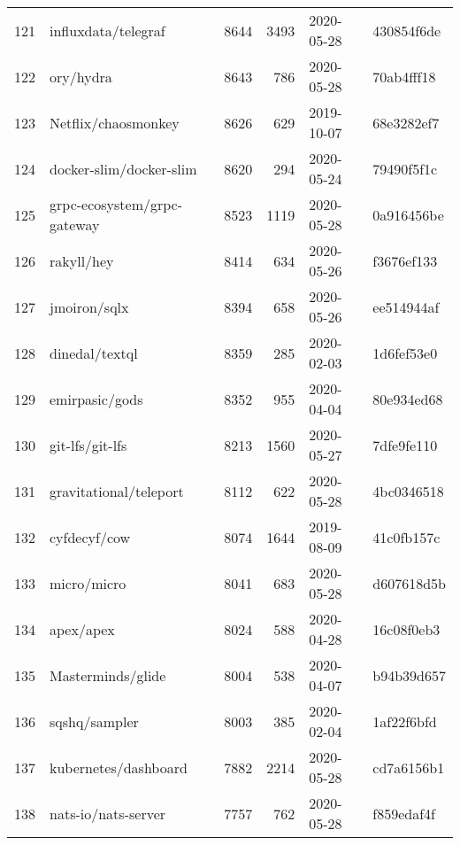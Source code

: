 \begin{longtable}{llrrll}
    121 &                                influxdata/telegraf &   8644 &   3493 & 2020-05-28 &  430854f6de \\
    122 &                                          ory/hydra &   8643 &    786 & 2020-05-28 &  70ab4fff18 \\
    123 &                                Netflix/chaosmonkey &   8626 &    629 & 2019-10-07 &  68e3282ef7 \\
    124 &                            docker-slim/docker-slim &   8620 &    294 & 2020-05-24 &  79490f5f1c \\
    125 &                        grpc-ecosystem/grpc-gateway &   8523 &   1119 & 2020-05-28 &  0a916456be \\
    126 &                                         rakyll/hey &   8414 &    634 & 2020-05-26 &  f3676ef133 \\
    127 &                                       jmoiron/sqlx &   8394 &    658 & 2020-05-26 &  ee514944af \\
    128 &                                     dinedal/textql &   8359 &    285 & 2020-02-03 &  1d6fef53e0 \\
    129 &                                     emirpasic/gods &   8352 &    955 & 2020-04-04 &  80e934ed68 \\
    130 &                                    git-lfs/git-lfs &   8213 &   1560 & 2020-05-27 &  7dfe9fe110 \\
    131 &                             gravitational/teleport &   8112 &    622 & 2020-05-28 &  4bc0346518 \\
    132 &                                       cyfdecyf/cow &   8074 &   1644 & 2019-08-09 &  41c0fb157c \\
    133 &                                        micro/micro &   8041 &    683 & 2020-05-28 &  d607618d5b \\
    134 &                                          apex/apex &   8024 &    588 & 2020-04-28 &  16c08f0eb3 \\
    135 &                                  Masterminds/glide &   8004 &    538 & 2020-04-07 &  b94b39d657 \\
    136 &                                      sqshq/sampler &   8003 &    385 & 2020-02-04 &  1af22f6bfd \\
    137 &                               kubernetes/dashboard &   7882 &   2214 & 2020-05-28 &  cd7a6156b1 \\
    138 &                                nats-io/nats-server &   7757 &    762 & 2020-05-28 &  f859edaf4f \\

\end{longtable}
